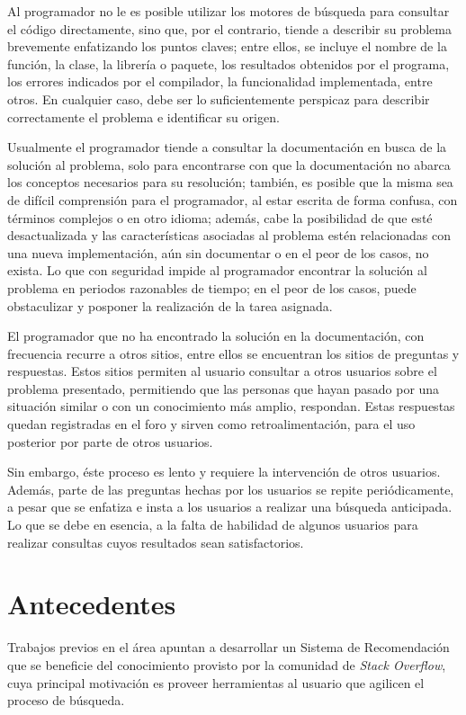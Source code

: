 Al programador no le es posible utilizar los motores de búsqueda para consultar el código directamente,
sino que, por el contrario, tiende a describir su problema brevemente enfatizando los puntos claves;
entre ellos, se incluye el nombre de la función, la clase, la librería o paquete,
los resultados obtenidos por el programa, los errores indicados por el compilador,
la funcionalidad implementada, entre otros. En cualquier caso,
debe ser lo suficientemente perspicaz para describir correctamente el problema e identificar su origen.

Usualmente el programador tiende a consultar la documentación en busca de la solución al problema,
solo para encontrarse con que la documentación no abarca los conceptos necesarios para su resolución;
también, es posible que la misma sea de difícil comprensión para el programador,
al estar escrita de forma confusa, con términos complejos o en otro idioma;
además, cabe la posibilidad de que esté desactualizada y 
las características asociadas al problema estén relacionadas con una nueva implementación,
aún sin documentar o en el peor de los casos, no exista.
Lo que con seguridad impide al programador encontrar la solución al problema en periodos razonables de tiempo;
en el peor de los casos, puede obstaculizar y posponer la realización de la tarea asignada.

El programador que no ha encontrado la solución en la documentación,
con frecuencia recurre a otros sitios, entre ellos se encuentran los sitios de preguntas y respuestas.
Estos sitios permiten al usuario consultar a otros usuarios sobre el problema presentado,
permitiendo que las personas que hayan pasado por una situación similar
o con un conocimiento más amplio, respondan.
Estas respuestas quedan registradas en el foro y sirven como retroalimentación,
para el uso posterior por parte de otros usuarios.

Sin embargo, éste proceso es lento y requiere la intervención de otros usuarios.
Además, parte de las preguntas hechas por los usuarios se repite periódicamente,
a pesar que se enfatiza e insta a los usuarios a realizar una búsqueda anticipada.
Lo que se debe en esencia, a la falta de habilidad de algunos usuarios para realizar
consultas cuyos resultados sean satisfactorios.

\section*{Antecedentes}

Trabajos previos en el área apuntan a desarrollar un Sistema de Recomendación
que se beneficie del conocimiento provisto por la comunidad de \textit{Stack Overflow},
cuya principal motivación es proveer herramientas al usuario que agilicen el proceso de búsqueda.


